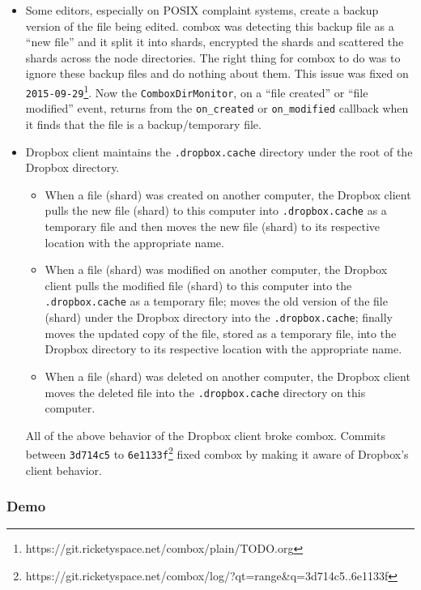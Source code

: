 \begin{itemize}
\item Some editors, especially on POSIX complaint systems, create a
  backup version of the file being edited. combox was detecting this
  backup file as a ``new file'' and it split it into shards, encrypted
  the shards and scattered the shards across the node directories. The
  right thing for combox to do was to ignore these backup files and do
  nothing about them. This issue was fixed on
  \verb+2015-09-29+\footnote{https://git.ricketyspace.net/combox/plain/TODO.org}. Now
  the \verb+ComboxDirMonitor+, on a ``file created'' or ``file
  modified'' event, returns from the \verb+on_created+ or
  \verb+on_modified+ callback when it finds that the file is a
  backup/temporary file.
\item Dropbox client maintains the \verb+.dropbox.cache+ directory
  under the root of the Dropbox directory.

  \begin{itemize}
  \item When a file (shard) was created on another computer, the
    Dropbox client pulls the new file (shard) to this computer into
    \verb+.dropbox.cache+ as a temporary file and then moves the new
    file (shard) to its respective location with the appropriate name.
  \item When a file (shard) was modified on another computer, the
    Dropbox client pulls the modified file (shard) to this computer
    into the \verb+.dropbox.cache+ as a temporary file; moves the old
    version of the file (shard) under the Dropbox directory into the
    \verb+.dropbox.cache+; finally moves the updated copy of the file,
    stored as a temporary file, into the Dropbox directory to its
    respective location with the appropriate name.
  \item When a file (shard) was deleted on another computer, the
    Dropbox client moves the deleted file into the
    \verb+.dropbox.cache+ directory on this computer.
  \end{itemize}

  All of the above behavior of the Dropbox client broke
  combox. Commits between \verb+3d714c5+ to
  \verb+6e1133f+\footnote{https://git.ricketyspace.net/combox/log/?qt=range\&q=3d714c5..6e1133f}
  fixed combox by making it aware of Dropbox's client behavior.
\end{itemize}

\subsubsection{Demo}

